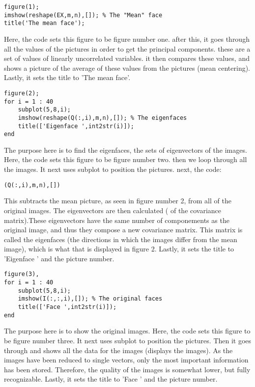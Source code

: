 \documentclass{article}
\begin{document}
\begin{verbatim}
figure(1);
imshow(reshape(EX,m,n),[]); % The "Mean" face
title('The mean face');
\end{verbatim}
Here, the code sets this figure to be figure number one.
after this, it goes through all the values of the pictures in order to get the principal
components. these are a set of values of linearly uncorrelated variables. it then compares
these values, and shows a picture of the average of these values from the pictures (mean
centering). 
Lastly, it sets the title to 'The mean face'.
\vspace{10pt}

\begin{verbatim}
figure(2);
for i = 1 : 40
    subplot(5,8,i);
    imshow(reshape(Q(:,i),m,n),[]); % The eigenfaces
    title(['Eigenface ',int2str(i)]);
end
\end{verbatim}
The purpose here is to find the eigenfaces, the sets of eigenvectors of the images.
Here, the code sets this figure to be figure number two.
then we loop through all the images. 
It next uses subplot to position the pictures. 
next, the code:
\begin{verbatim}
(Q(:,i),m,n),[])
\end{verbatim}
This subtracts the mean picture, as seen in figure number 2, from all of the original
images. 
The eigenvectors are then calculated ( of the covariance matrix).These eigenvectors have the
same number of componements as the original image, and thus they compose a new covariance
matrix. This matrix is called the eigenfaces (the directions in which the images differ from
the mean image), which is what that is displayed in figure 2.
Lastly, it sets the title to 'Eigenface ' and the picture number.
\vspace{10pt}

\begin{verbatim}
figure(3),
for i = 1 : 40
    subplot(5,8,i);
    imshow(I(:,:,i),[]); % The original faces
    title(['Face ',int2str(i)]);
end
\end{verbatim}
The purpose here is to show the original images.
Here, the code sets this figure to be figure number three.
It next uses subplot to position the pictures. 
Then it goes through and shows all the data for the images (displays the images).
As the images have been reduced to single vectors, only the most important information has
been stored. Therefore, the quality of the images is somewhat lower, but fully recognizable.
Lastly, it sets the title to 'Face ' and the picture number.
\vspace{10pt}
\end{document}
